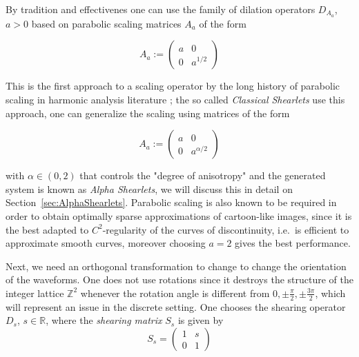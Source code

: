 \bigskip

By tradition and effectivenes one can use the family of dilation operators $D_{A_a}$, $a>0$ based on parabolic scaling matrices $A_a$ of the form

\begin{equation}
\label{eq:scaling}
A_a:=
\left(
\begin{matrix}
a & 0 \\
0 & a^{1/2}
\end{matrix}
\right)
\end{equation}

This is the first approach to a scaling operator by the long history of parabolic scaling in harmonic analysis literature \cite{Fefferman}; the so called \textit{Classical Shearlets} use this approach, one can generalize the scaling using matrices of the form 

\begin{equation}
\label{eq:scalingalpha}
A_a:=
\left(
\begin{matrix}
a & 0 \\
0 & a^{\alpha/2}
\end{matrix}
\right)
\end{equation}

with $\alpha\in (0,2)$ that controls the "degree of anisotropy" and the generated system is known as \textit{Alpha Shearlets}, we will discuss this in detail on Section~\ref{sec:AlphaShearlets}. Parabolic scaling is also known to be required in order to obtain optimally sparse approximations of cartoon-like images, since it is the best adapted to $C^2$-regularity of the curves of discontinuity, i.e.\ is efficient to approximate smooth curves, moreover choosing $a=2$ gives the best performance.

\bigskip

 Next, we need an orthogonal transformation to change to change the orientation of the waveforms. One does not use rotations since it destroys the structure of the integer lattice $\mathbb{Z}^2$ whenever the rotation angle is different from $0,\pm\frac{\pi}{2},\pm\frac{3\pi}{2}$, which will represent an issue in the discrete setting. One chooses the shearing operator $D_s$, $s\in\mathbb{R}$, where the \textit{shearing matrix} $S_s$ is given by 
\begin{equation}
\label{eq:shearing}
S_s=
\left(
\begin{matrix}
1 & s \\
0 & 1
\end{matrix}
\right)
\end{equation}


